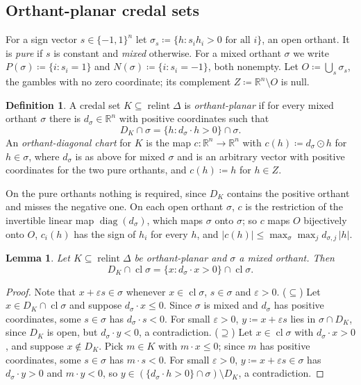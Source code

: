 \documentclass[11pt]{article}
\newcommand{\R}{\mathbb{R}}
\DeclareMathOperator{\relint}{relint}
\DeclareMathOperator{\cl}{cl}
\theoremstyle{plain}
\newtheorem{lemma}[theorem]{Lemma}
\theoremstyle{definition}
\newtheorem{definition}[theorem]{Definition}
\theoremstyle{remark}
\begin{document}
\subsection{Orthant-planar credal sets}

For a sign vector $s\in\{-1,1\}^n$ let $\sigma_s\coloneqq\{h:s_ih_i>0\text{ for all }i\}$,
an open orthant. It is \emph{pure} if $s$ is constant and \emph{mixed} otherwise. For a
mixed orthant $\sigma$ we write $P(\sigma)\coloneqq\{i:s_i=1\}$ and
$N(\sigma)\coloneqq\{i:s_i=-1\}$, both nonempty. Let $O\coloneqq\bigcup_s\sigma_s$, the
gambles with no zero coordinate; its complement $Z\coloneqq\R^n\setminus O$ is null.

\begin{definition}\label{def:op}
A credal set $K\subseteq\relint\Delta$ is \emph{orthant-planar} if for every mixed orthant
$\sigma$ there is $d_\sigma\in\R^n$ with positive coordinates such that
\[
  D_K\cap\sigma=\{h:d_\sigma\cdot h>0\}\cap\sigma .
\]
An \emph{orthant-diagonal chart} for $K$ is the map $c:\R^n\to\R^n$ with
$c(h)\coloneqq d_\sigma\odot h$ for $h\in\sigma$, where $d_\sigma$ is as above for mixed
$\sigma$ and is an arbitrary vector with positive coordinates for the two pure orthants, and
$c(h)\coloneqq h$ for $h\in Z$.
\end{definition}

On the pure orthants nothing is required, since $D_K$ contains the positive orthant and
misses the negative one. On each open orthant $\sigma$, $c$ is the restriction of the
invertible linear map $\operatorname{diag}(d_\sigma)$, which maps $\sigma$ onto $\sigma$;
so $c$ maps $O$ bijectively onto $O$, $c_i(h)$ has the sign of $h_i$ for every $h$, and
$|c(h)|\le\max_\sigma\max_jd_{\sigma,j}\,|h|$.

\begin{lemma}\label{lem:closedorthant}
Let $K\subseteq\relint\Delta$ be orthant-planar and $\sigma$ a mixed orthant. Then
\[
  D_K\cap\cl\sigma=\{x:d_\sigma\cdot x>0\}\cap\cl\sigma .
\]
\end{lemma}

\begin{proof}
Note that $x+\varepsilon s\in\sigma$ whenever $x\in\cl\sigma$, $s\in\sigma$ and
$\varepsilon>0$.
($\subseteq$) Let $x\in D_K\cap\cl\sigma$ and suppose $d_\sigma\cdot x\le0$. Since
$\sigma$ is mixed and $d_\sigma$ has positive coordinates, some $s\in\sigma$ has
$d_\sigma\cdot s<0$. For small $\varepsilon>0$, $y\coloneqq x+\varepsilon s$ lies in
$\sigma\cap D_K$, since $D_K$ is open, but $d_\sigma\cdot y<0$, a contradiction.
($\supseteq$) Let $x\in\cl\sigma$ with $d_\sigma\cdot x>0$, and suppose $x\notin D_K$. Pick
$m\in K$ with $m\cdot x\le0$; since $m$ has positive coordinates, some $s\in\sigma$ has
$m\cdot s<0$. For small $\varepsilon>0$, $y\coloneqq x+\varepsilon s\in\sigma$ has
$d_\sigma\cdot y>0$ and $m\cdot y<0$, so $y\in(\{d_\sigma\cdot h>0\}\cap\sigma)\setminus
D_K$, a contradiction.
\end{proof}
\end{document}
